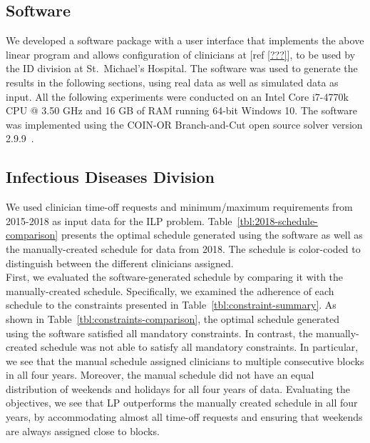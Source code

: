 \subsection{Software}
We developed a software package with a user interface that implements the above
linear program and allows configuration of clinicians at [ref \ref{???}], to be
used by the ID division at St.\ Michael's Hospital. The software was used to
generate the results in the following sections, using real data as well as
simulated data as input. All the following experiments were conducted on an
Intel Core i7-4770k CPU @ 3.50 GHz and 16 GB of RAM running 64-bit Windows 10.
The software was implemented using the COIN-OR Branch-and-Cut open source solver
version 2.9.9~\cite{johnjforrest_coin-or/cbc:_2019}.

\subsection{Infectious Diseases Division}  %
We used clinician time-off requests and minimum/maximum requirements from
2015-2018 as input data for the ILP problem. Table~\ref{tbl:2018-schedule-comparison} presents the optimal schedule generated using
the software as well as the manually-created schedule for data from 2018. The
schedule is color-coded to distinguish between the different clinicians
assigned. \\



First, we evaluated the software-generated schedule by comparing it with the
manually-created schedule. Specifically, we examined the adherence of each
schedule to the constraints presented in Table~\ref{tbl:constraint-summary}. As
shown in Table~\ref{tbl:constraints-comparison}, the optimal schedule generated
using the software satisfied all mandatory constraints. In contrast, the
manually-created schedule was not able to satisfy all mandatory constraints. In
particular, we see that the manual schedule assigned clinicians to multiple
consecutive blocks in all four years. Moreover, the manual schedule did not have
an equal distribution of weekends and holidays for all four years of data.
Evaluating the objectives, we see that LP outperforms the manually created
schedule in all four years, by accommodating almost all time-off requests and
ensuring that weekends are always assigned close to blocks. \\

